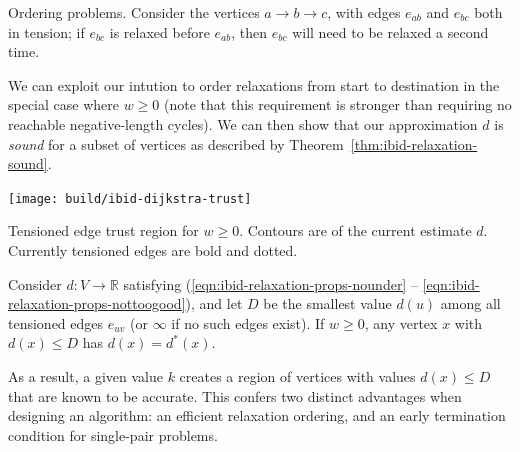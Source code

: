 \begin{marginfigure}
   \caption{Ordering problems.
      Consider the vertices $a \rightarrow b \rightarrow c$,
      with edges $e_{ab}$ and $e_{bc}$ both in tension;
      if $e_{bc}$ is relaxed before $e_{ab}$,
      then $e_{bc}$ will need to be relaxed a second time.}
   \label{fig:ibid:bellman-ford-repetitions}
\end{marginfigure}

We can exploit our intution to order relaxations from start to destination
in the special case where $w \geq 0$
(note that this requirement is stronger than requiring no reachable
negative-length cycles).
We can then show that our approximation $d$
is \emph{sound} for a subset of vertices
as described by Theorem~\ref{thm:ibid-relaxation-sound}.

\begin{marginfigure}
   \centering
   \texttt{[image: build/ibid-dijkstra-trust]}
   \caption{Tensioned edge trust region
      for $w \geq 0$.
      Contours are of the current estimate $d$.
      Currently tensioned edges are bold and dotted.}
\end{marginfigure}

\begin{theorem}
Consider $d: V \rightarrow \mathbb{R}$
satisfying (\ref{eqn:ibid-relaxation-props-nounder} --
\ref{eqn:ibid-relaxation-props-nottoogood}),
and let $D$ be the smallest value $d(u)$
among all tensioned edges $e_{uv}$
(or $\infty$ if no such edges exist).
If $w \geq 0$,
any vertex $x$ with $d(x) \leq D$
has $d(x) = d^*(x)$.
\label{thm:ibid-relaxation-sound}
\end{theorem}
As a result,
a given value $k$ creates a region of vertices
with values $d(x) \leq D$ that are known to be
accurate.
This confers two distinct advantages when designing an algorithm:
an efficient relaxation ordering,
and an early termination condition for single-pair problems.

